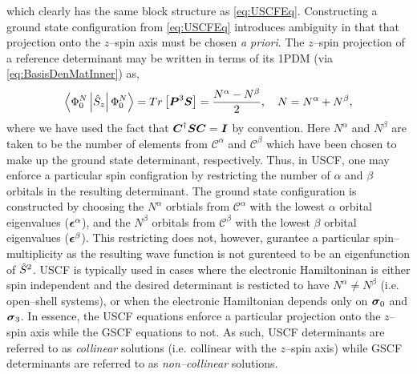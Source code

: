 which clearly has the same block structure as \cref{eq:USCFEq}. Constructing a ground state configuration 
from \cref{eq:USCFEq} introduces ambiguity in that that projection onto the $z$--spin axis must be
chosen \emph{a priori}. The $z$--spin projection of a reference determinant may be written in terms of its
1PDM (via \cref{eq:BasisDenMatInner}) as,
\begin{equation}
  \left\langle \Phi^N_0 \left\vert \hat{S}_z \right\vert \Phi^N_0 \right\rangle = Tr \left[ \boldsymbol{P}^3 \boldsymbol{S} \right] = \frac{N^\alpha - N^\beta}{2}, \quad N = N^\alpha + N^\beta,
\end{equation}
where we have used the fact that $\boldsymbol{C}^\dagger \boldsymbol{S} \boldsymbol{C} = \boldsymbol{I}$ by convention. Here $N^\alpha$ and 
$N^\beta$ are taken to be the number of elements from $\mathcal C^\alpha$ and $\mathcal C^\beta$ which
have been chosen to make up the ground state determinant, respectively. Thus, in USCF, one may enforce a particular
spin configration by restricting the number of $\alpha$ and $\beta$ orbitals in the resulting determinant.
The ground state configuration is constructed by choosing the $N^\alpha$ orbtials from $\mathcal C^\alpha$ with
the lowest $\alpha$ orbital eigenvalues ($\boldsymbol{\epsilon}^\alpha$), and the $N^\beta$ orbitals from $\mathcal C^\beta$ with the lowest
$\beta$ orbital eigenvalues ($\boldsymbol{\epsilon}^\beta$).
This restricting does not, however, gurantee a particular spin--multiplicity as the resulting wave function 
is not gurenteed to be an eigenfunction of $\hat{S}^2$. 
USCF is typically used in cases where the electronic Hamiltoninan is either spin independent and the desired 
determinant is resticted to have $N^\alpha \neq N^\beta$ (i.e. open--shell systems), or when the electronic Hamiltonian depends only on
$\boldsymbol{\sigma}_{0}$ and $\boldsymbol{\sigma}_{3}$. In essence, the USCF equations enforce a particular projection onto the $z$--spin
axis while the GSCF equations to not. As such, USCF determinants are referred to as \emph{collinear} solutions
(i.e. collinear with the $z$--spin axis) while GSCF determinants are referred to as \emph{non--collinear}
solutions.

